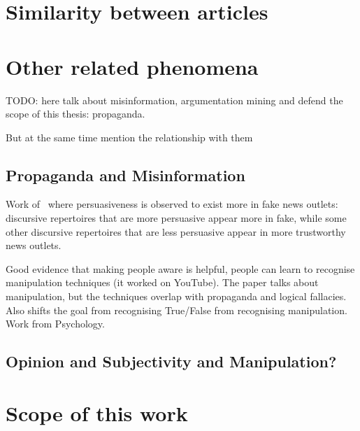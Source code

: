 






\section{Similarity between articles}
\label{sec:lit_relationships}

\section{Other related phenomena}

TODO: here talk about misinformation, argumentation mining and defend the scope of this thesis: propaganda.

But at the same time mention the relationship with them

\subsection{Propaganda and Misinformation}

Work of~\citet{orrumachine} where persuasiveness is observed to exist more in fake news outlets: discursive repertoires that are more persuasive appear more in fake, while some other discursive repertoires that are less persuasive appear in more trustworthy news outlets.




\cite{roozenbeek2022countering} Good evidence that making people aware is helpful, people can learn to recognise manipulation techniques (it worked on YouTube). The paper talks about manipulation, but the techniques overlap with propaganda and logical fallacies. Also shifts the goal from recognising True/False from recognising manipulation. Work from Psychology.

\subsection{Opinion and Subjectivity and Manipulation?}

\section{Scope of this work}

